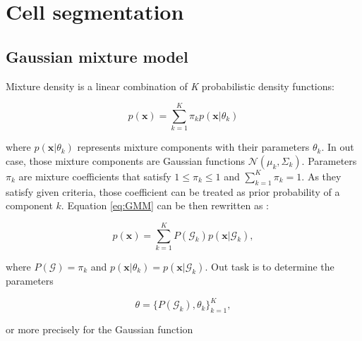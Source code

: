 
\chapter{Cell segmentation} %

\label{Chapter4} %







\section{Gaussian mixture model} 

Mixture density is a linear combination of \textit{K} probabilistic density functions:

\begin{equation}
	p(\mathbf{x}) = \sum_{k=1}^{K}\pi_k p(\mathbf{x} | \theta_k)
	\label{eq:GMM}
\end{equation}
	 
where $p(\mathbf{x} | \theta_k)$ represents mixture components with their parameters $\theta_k$. In out case, those mixture components are Gaussian functions $\mathcal{N}(\mu_k, \Sigma_k)$. Parameters $\pi_k$ are mixture coefficients that satisfy $1 \leq \pi_k \leq 1$ and $\sum_{k=1}^{K} \pi_k = 1$. As they satisfy given criteria, those coefficient can be treated as prior probability of a component $k$. Equation \ref{eq:GMM} can be then rewritten as :

\begin{equation}
	p(\mathbf{x}) = \sum_{k=1}^{K} P(\mathcal{G}_k) p(\mathbf{x} | \mathcal{G}_k),
\end{equation}

where $P(\mathcal{G}) = \pi_k$ and $ p(\mathbf{x} | \theta_k) =  p(\mathbf{x} | \mathcal{G}_k)$. Out task is to determine the parameters

$$ \theta = \{ P(\mathcal{G}_k), \theta_k \}_{k=1}^K,$$

or more precisely for the Gaussian function

